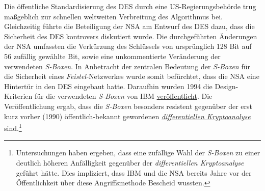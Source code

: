 Die öffentliche Standardisierung des DES durch eine US-Regierungsbehörde trug maßgeblich zur schnellen weltweiten Verbreitung des Algorithmus bei. Gleichzeitig führte die Beteiligung der NSA am Entwurf des DES dazu, dass die Sicherheit des DES kontrovers diskutiert wurde. Die durchgeführten Änderungen der NSA umfassten die Verkürzung des Schlüssels von ursprünglich 128 Bit auf 56 zufällig gewählte Bit, sowie eine unkommentierte Veränderung der verwendeten \textit{S-Boxen}. In Anbetracht der zentralen Bedeutung der \textit{S-Boxen} für die Sicherheit eines \textit{Feistel-}Netzwerkes wurde somit befürchtet, dass die NSA eine Hintertür in den DES eingebaut hatte. Daraufhin wurden 1994 die Design-Kriterien für die verwendeten \textit{S-Boxen} von IBM \href{http://simson.net/ref/1994/coppersmith94.pdf}{veröffentlicht}. Die Veröffentlichung ergab, dass die \textit{S-Boxen} besonders resistent gegenüber der erst kurz vorher (1990) öffentlich-bekannt gewordenen \hyperref[sssec:diffKryptoanalyse]{\textit{differentiellen Kryptoanalyse}} sind.\footnote{Untersuchungen haben ergeben, dass eine zufällige Wahl der \textit{S-Boxen} zu einer deutlich höheren Anfälligkeit gegenüber der \textit{differentiellen Kryptoanalyse} geführt hätte. Dies impliziert, dass IBM und die NSA bereits Jahre vor der Öffentlichkeit über diese Angriffsmethode Bescheid wussten.}
\newpage
\bigskip
